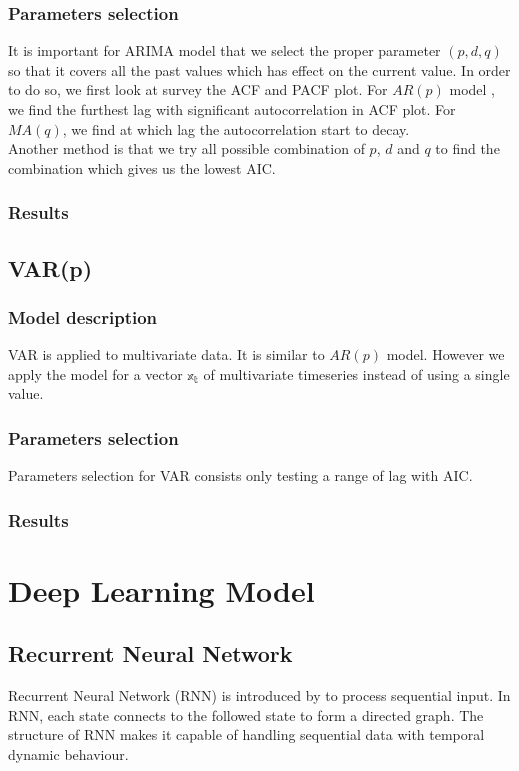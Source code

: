 \documentclass[11pt]{article}
\begin{document}
\subsubsection{Parameters selection}
It is important for ARIMA model that we select the proper parameter $(p, d, q)$
so that it covers all the past values which has effect on the current value. In
order to do so, we first look at survey the ACF and PACF plot. For ${AR}(p)$ model
, we find the furthest lag with significant autocorrelation in ACF plot. For
$MA(q)$, we find at which lag the autocorrelation start to decay.\\
Another method is that we try all possible combination of $p$, $d$ and $q$ to
find the combination which gives us the lowest AIC.

\subsubsection{Results}


\subsection{VAR(p)}
\subsubsection{Model description}
VAR is applied to multivariate data. It is similar to $AR(p)$ model. However we
apply the model for a vector ${\mathbb{x_t}}$ of multivariate timeseries instead
of using a single value.

\subsubsection{Parameters selection}
Parameters selection for VAR consists only testing a range of lag with AIC. 

\subsubsection{Results} 



\section{Deep Learning Model}
\subsection{Recurrent Neural Network}
Recurrent Neural Network (RNN) is introduced by \cite{rumelhart1988learning} to
process sequential input. In RNN, each state connects to the followed state to
form a directed graph. The structure of RNN makes it capable of handling
sequential data with temporal dynamic behaviour.
\end{document}
